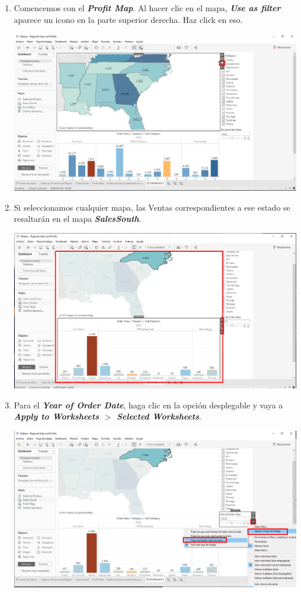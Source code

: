 \documentclass[12pt,letterpaper]{article}
\begin{document}
    \begin{enumerate}
        \item Comencemos con el \textit{\textbf{Profit Map}}. Al hacer clic en el mapa, \textit{\textbf{Use as filter}} aparece un icono en la parte superior derecha. Haz click en eso.
        \begin{center}
            \includegraphics[width=15cm]{./img/img81.png}
        \end{center}
        \item Si seleccionamos cualquier mapa, las Ventas correspondientes a ese estado se resaltarán en el mapa \textit{\textbf{SalesSouth}}.
        \begin{center}
            \includegraphics[width=15cm]{./img/img82.png}
        \end{center}
        \item Para el \textit{\textbf{Year of Order Date}}, haga clic en la opción desplegable y vaya a \textit{\textbf{Apply to Worksheets $>$ Selected Worksheets}}.
        \begin{center}
            \includegraphics[width=15cm]{./img/img83.png}

\end{center}
\end{enumerate}
\end{document}

